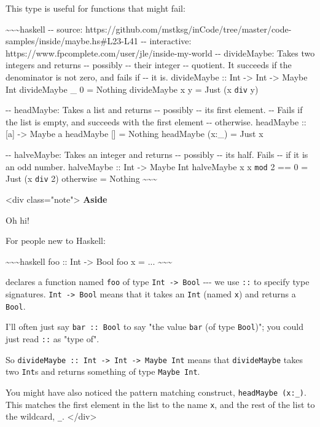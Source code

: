 \documentclass[]{article}
\begin{document}
This type is useful for functions that might fail:

\textasciitilde{}\textasciitilde{}\textasciitilde{}haskell -\/- source:
https://github.com/mstksg/inCode/tree/master/code-samples/inside/maybe.hs\#L23-L41
-\/- interactive: https://www.fpcomplete.com/user/jle/inside-my-world -\/-
divideMaybe: Takes two integers and returns -\/- possibly -\/- their integer
-\/- quotient. It succeeds if the denominator is not zero, and fails if -\/- it
is. divideMaybe :: Int -\textgreater{} Int -\textgreater{} Maybe Int divideMaybe
\_ 0 = Nothing divideMaybe x y = Just (x \texttt{div} y)

-\/- headMaybe: Takes a list and returns -\/- possibly -\/- its first element.
-\/- Fails if the list is empty, and succeeds with the first element -\/-
otherwise. headMaybe :: {[}a{]} -\textgreater{} Maybe a headMaybe {[}{]} =
Nothing headMaybe (x:\_) = Just x

-\/- halveMaybe: Takes an integer and returns -\/- possibly -\/- its half. Fails
-\/- if it is an odd number. halveMaybe :: Int -\textgreater{} Maybe Int
halveMaybe x \textbar{} x \texttt{mod} 2 == 0 = Just (x \texttt{div} 2)
\textbar{} otherwise = Nothing
\textasciitilde{}\textasciitilde{}\textasciitilde{}

\textless{}div class="note"\textgreater{} \textbf{Aside}

Oh hi!

For people new to Haskell:

\textasciitilde{}\textasciitilde{}\textasciitilde{}haskell foo :: Int
-\textgreater{} Bool foo x = ...
\textasciitilde{}\textasciitilde{}\textasciitilde{}

declares a function named \texttt{foo} of type
\texttt{Int\ -\textgreater{}\ Bool} -\/-\/- we use \texttt{::} to specify type
signatures. \texttt{Int\ -\textgreater{}\ Bool} means that it takes an
\texttt{Int} (named \texttt{x}) and returns a \texttt{Bool}.

I'll often just say \texttt{bar\ ::\ Bool} to say "the value \texttt{bar} (of
type \texttt{Bool})"; you could just read \texttt{::} as "type of".

So
\texttt{divideMaybe\ ::\ Int\ -\textgreater{}\ Int\ -\textgreater{}\ Maybe\ Int}
means that \texttt{divideMaybe} takes two \texttt{Int}s and returns something of
type \texttt{Maybe\ Int}.

You might have also noticed the pattern matching construct,
\texttt{headMaybe\ (x:\_)}. This matches the first element in the list to the
name \texttt{x}, and the rest of the list to the wildcard, \texttt{\_}.
\textless{}/div\textgreater{}
\end{document}
